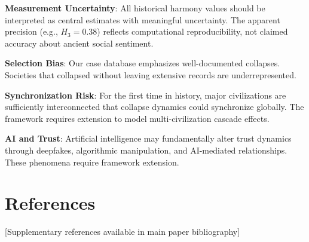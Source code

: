 \documentclass[11pt,a4paper]{article}
\newcommand{\Hthree}{H_3}
\begin{document}
\textbf{Measurement Uncertainty}: All historical harmony values should be interpreted as central estimates with meaningful uncertainty. The apparent precision (e.g., $\Hthree = 0.38$) reflects computational reproducibility, not claimed accuracy about ancient social sentiment.

\textbf{Selection Bias}: Our case database emphasizes well-documented collapses. Societies that collapsed without leaving extensive records are underrepresented.

\textbf{Synchronization Risk}: For the first time in history, major civilizations are sufficiently interconnected that collapse dynamics could synchronize globally. The framework requires extension to model multi-civilization cascade effects.

\textbf{AI and Trust}: Artificial intelligence may fundamentally alter trust dynamics through deepfakes, algorithmic manipulation, and AI-mediated relationships. These phenomena require framework extension.

\section*{References}

[Supplementary references available in main paper bibliography]
\end{document}
